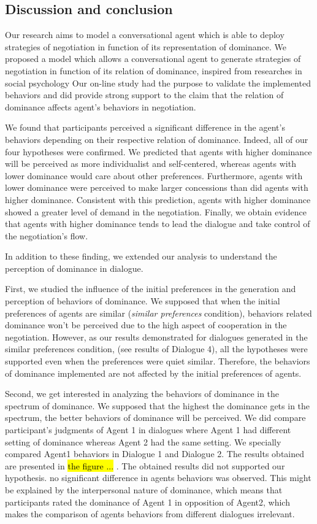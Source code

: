\documentclass{llncs}
\begin{document}
	\subsection{Discussion and conclusion}
	
	Our research aims to model a conversational agent which is able to deploy strategies of negotiation in function of its representation of dominance. 
	We proposed a model which allows a conversational agent to generate strategies of negotiation in function of its relation of dominance, inspired from researches in social psychology
	Our on-line study had the purpose to validate the implemented behaviors and did provide strong support to the claim that the relation of dominance affects agent's behaviors in negotiation.
	
	We found that participants perceived a significant difference in the agent's behaviors depending on their respective relation of dominance.  
	Indeed, all of our four hypotheses were confirmed. We predicted that agents with higher dominance will be perceived as more individualist and self-centered, whereas agents with lower dominance would care about other preferences. Furthermore, agents with lower dominance were perceived to make larger concessions than did agents with higher dominance. Consistent with this prediction, agents with higher dominance showed a greater level of demand in the negotiation. Finally, we obtain evidence that agents with higher dominance tends to lead the dialogue and take control of the negotiation's flow. 
	
	In addition to these finding, we extended our analysis to understand the perception of dominance in dialogue.
	
	First, we studied the influence of the initial preferences in the generation and perception of behaviors of dominance.
	We supposed that when the initial preferences of agents are similar (\textit{similar preferences} condition), behaviors related dominance won't be perceived due to the high aspect of cooperation in the negotiation. However, as our results demonstrated for dialogues generated in the similar preferences condition, (see results of Dialogue 4), all the hypotheses were supported even when the preferences were quiet similar. Therefore, the behaviors of dominance implemented are not affected by the initial preferences of agents.
	
	Second, we get interested in analyzing the behaviors of dominance in the spectrum of dominance. We supposed that the highest the dominance gets in the spectrum, the better behaviors of dominance will be perceived. We did compare participant's judgments of Agent 1 in dialogues where Agent 1 had different setting of dominance whereas Agent 2 had the same setting. We specially compared Agent1 behaviors in Dialogue 1 and Dialogue 2. The results obtained are presented in \hl{the figure ... }.	
	The obtained results did not supported our hypothesis. no significant difference in agents behaviors was observed. This might be explained by the interpersonal nature of dominance, which means that participants rated the dominance of Agent 1 in opposition of Agent2, which makes the comparison of agents behaviors from different dialogues irrelevant. 
	
\end{document}
